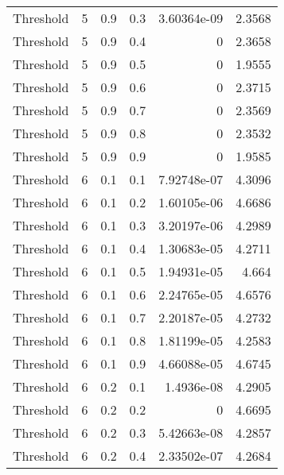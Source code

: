 \documentclass{article}
\begin{document}
\begin{longtable}[H]{lrrrrr}
 Threshold      &       5 &   0.9 &            0.3 &      3.60364e-09 &          2.3568 \\
 Threshold      &       5 &   0.9 &            0.4 &      0           &          2.3658 \\
 Threshold      &       5 &   0.9 &            0.5 &      0           &          1.9555 \\
 Threshold      &       5 &   0.9 &            0.6 &      0           &          2.3715 \\
 Threshold      &       5 &   0.9 &            0.7 &      0           &          2.3569 \\
 Threshold      &       5 &   0.9 &            0.8 &      0           &          2.3532 \\
 Threshold      &       5 &   0.9 &            0.9 &      0           &          1.9585 \\
 Threshold      &       6 &   0.1 &            0.1 &      7.92748e-07 &          4.3096 \\
 Threshold      &       6 &   0.1 &            0.2 &      1.60105e-06 &          4.6686 \\
 Threshold      &       6 &   0.1 &            0.3 &      3.20197e-06 &          4.2989 \\
 Threshold      &       6 &   0.1 &            0.4 &      1.30683e-05 &          4.2711 \\
 Threshold      &       6 &   0.1 &            0.5 &      1.94931e-05 &          4.664  \\
 Threshold      &       6 &   0.1 &            0.6 &      2.24765e-05 &          4.6576 \\
 Threshold      &       6 &   0.1 &            0.7 &      2.20187e-05 &          4.2732 \\
 Threshold      &       6 &   0.1 &            0.8 &      1.81199e-05 &          4.2583 \\
 Threshold      &       6 &   0.1 &            0.9 &      4.66088e-05 &          4.6745 \\
 Threshold      &       6 &   0.2 &            0.1 &      1.4936e-08  &          4.2905 \\
 Threshold      &       6 &   0.2 &            0.2 &      0           &          4.6695 \\
 Threshold      &       6 &   0.2 &            0.3 &      5.42663e-08 &          4.2857 \\
 Threshold      &       6 &   0.2 &            0.4 &      2.33502e-07 &          4.2684 \\

\end{longtable}
\end{document}
